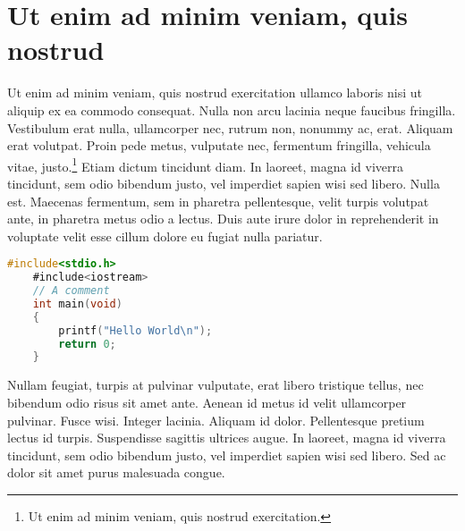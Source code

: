 \section{Ut enim ad minim veniam, quis nostrud}

Ut enim ad minim veniam, quis nostrud exercitation ullamco laboris nisi ut aliquip ex ea commodo consequat. Nulla non arcu lacinia neque faucibus fringilla. Vestibulum erat nulla, ullamcorper nec, rutrum non, nonummy ac, erat. Aliquam erat volutpat. Proin pede metus, vulputate nec, fermentum fringilla, vehicula vitae, justo.\footnote{Ut enim ad minim veniam, quis nostrud exercitation.} Etiam dictum tincidunt diam. In laoreet, magna id viverra tincidunt, sem odio bibendum justo, vel imperdiet sapien wisi sed libero. Nulla est. Maecenas fermentum, sem in pharetra pellentesque, velit turpis volutpat ante, in pharetra metus odio a lectus. Duis aute irure dolor in reprehenderit in voluptate velit esse cillum dolore eu fugiat nulla pariatur.

\begin{lstlisting}[caption={~Zbytečný kód},label=list:8-6,captionpos=t,float,abovecaptionskip=-\medskipamount,belowcaptionskip=\medskipamount,language=C]
    #include<stdio.h>
    #include<iostream>
    // A comment
    int main(void)
    {
        printf("Hello World\n");
        return 0;
    }
\end{lstlisting}

Nullam feugiat, turpis at pulvinar vulputate, erat libero tristique tellus, nec bibendum odio risus sit amet ante. Aenean id metus id velit ullamcorper pulvinar. Fusce wisi. Integer lacinia. Aliquam id dolor. Pellentesque pretium lectus id turpis. Suspendisse sagittis ultrices augue. In laoreet, magna id viverra tincidunt, sem odio bibendum justo, vel imperdiet sapien wisi sed libero. Sed ac dolor sit amet purus malesuada congue. \cite{Crochemore2002}

